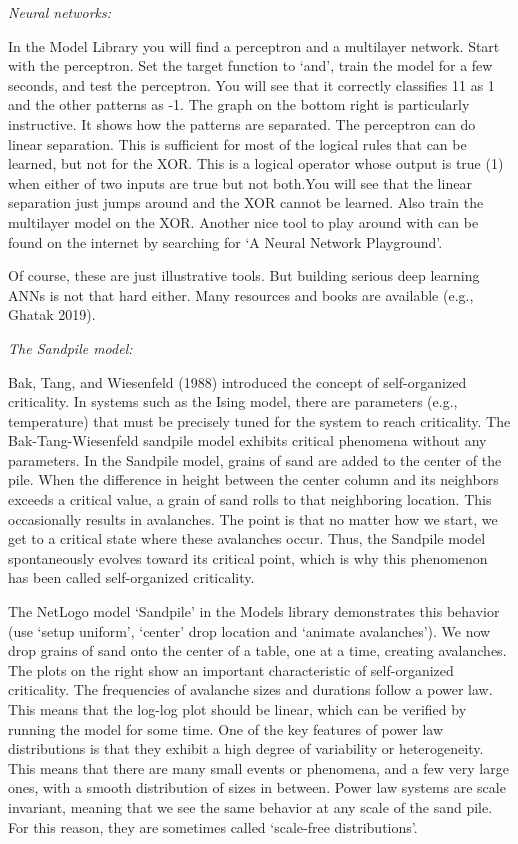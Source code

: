 \documentclass[
  a4paper,
  DIV=11,
  numbers=noendperiod]{scrreprt}
\begin{document}
\emph{Neural networks:}

In the Model Library you will find a perceptron and a multilayer
network. Start with the perceptron. Set the target function to `and',
train the model for a few seconds, and test the perceptron. You will see
that it correctly classifies 11 as 1 and the other patterns as -1. The
graph on the bottom right is particularly instructive. It shows how the
patterns are separated. The perceptron can do linear separation. This is
sufficient for most of the logical rules that can be learned, but not
for the XOR. This is a logical operator whose output is true (1) when
either of two inputs are true but not both.You will see that the linear
separation just jumps around and the XOR cannot be learned. Also train
the multilayer model on the XOR. Another nice tool to play around with
can be found on the internet by searching for `A Neural Network
Playground'.

Of course, these are just illustrative tools. But building serious deep
learning ANNs is not that hard either. Many resources and books are
available (e.g., Ghatak 2019).

\emph{The Sandpile model:}

Bak, Tang, and Wiesenfeld (1988) introduced the concept of
self-organized criticality. In systems such as the Ising model, there
are parameters (e.g., temperature) that must be precisely tuned for the
system to reach criticality. The Bak-Tang-Wiesenfeld sandpile model
exhibits critical phenomena without any parameters. In the Sandpile
model, grains of sand are added to the center of the pile. When the
difference in height between the center column and its neighbors exceeds
a critical value, a grain of sand rolls to that neighboring location.
This occasionally results in avalanches. The point is that no matter how
we start, we get to a critical state where these avalanches occur. Thus,
the Sandpile model spontaneously evolves toward its critical point,
which is why this phenomenon has been called self-organized criticality.

The NetLogo model `Sandpile' in the Models library demonstrates this
behavior (use `setup uniform', `center' drop location and `animate
avalanches'). We now drop grains of sand onto the center of a table, one
at a time, creating avalanches. The plots on the right show an important
characteristic of self-organized criticality. The frequencies of
avalanche sizes and durations follow a power law. This means that the
log-log plot should be linear, which can be verified by running the
model for some time. One of the key features of power law distributions
is that they exhibit a high degree of variability or heterogeneity. This
means that there are many small events or phenomena, and a few very
large ones, with a smooth distribution of sizes in between. Power law
systems are scale invariant, meaning that we see the same behavior at
any scale of the sand pile. For this reason, they are sometimes called
`scale-free distributions'.
\end{document}
